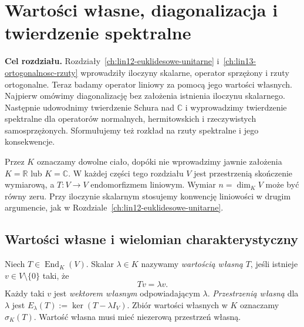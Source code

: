 \chapter{Wartości własne, diagonalizacja i twierdzenie spektralne}
\label{ch:lin14-spektralne}

\providecommand{\atlasref}[2]{#2}

\noindent\textbf{Cel rozdziału.}
Rozdziały~\ref{ch:lin12-euklidesowe-unitarne}
i~\ref{ch:lin13-ortogonalnosc-rzuty}
wprowadziły iloczyny skalarne, operator sprzężony
i rzuty ortogonalne. Teraz badamy operator liniowy
za pomocą jego wartości własnych. Najpierw omówimy
diagonalizację bez założenia istnienia iloczynu skalarnego.
Następnie udowodnimy twierdzenie Schura nad
\(\mathbb C\) i wyprowadzimy twierdzenie spektralne
dla operatorów normalnych, hermitowskich i
rzeczywistych samosprzężonych. Sformułujemy też
rozkład na rzuty spektralne i jego konsekwencje.

Przez \(K\) oznaczamy dowolne ciało, dopóki nie
wprowadzimy jawnie założenia \(K=\mathbb R\)
lub \(K=\mathbb C\).
W każdej części tego rozdziału \(V\) jest przestrzenią
skończenie wymiarową, a \(T\colon V\to V\)
endomorfizmem liniowym. Wymiar \(n=\dim_K V\)
może być równy zeru.
Przy iloczynie skalarnym stosujemy konwencję
liniowości w drugim argumencie, jak w
Rozdziale~\ref{ch:lin12-euklidesowe-unitarne}.

\section{Wartości własne i wielomian charakterystyczny}
\label{sec:lin14-wartosci}

\begin{definicja}
\label{def:lin14-wlasne}
Niech \(T\in\operatorname{End}_K(V)\).
Skalar \(\lambda\in K\) nazywamy
\emph{wartością własną} \(T\),
jeśli istnieje \(v\in V\setminus\{0\}\) taki, że
\[
 Tv=\lambda v.
\]
Każdy taki \(v\) jest \emph{wektorem własnym}
odpowiadającym \(\lambda\).
\emph{Przestrzenią własną} dla \(\lambda\) jest
\(E_\lambda(T):=\ker(T-\lambda I_V)\).
Zbiór wartości własnych w \(K\) oznaczamy
\(\sigma_K(T)\).
Wartość własna musi mieć
niezerową przestrzeń własną.
\end{definicja}

